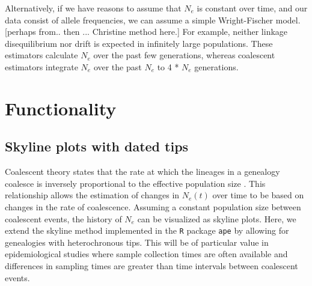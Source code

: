 \documentclass[english,titlepage]{article}
\begin{document}
Alternatively, if we have reasons to assume that $N_{e}$ is constant over time, and our data consist of allele frequencies, we can assume a simple Wright-Fischer model. [perhaps from.. then ... Christine method here.] For example, neither linkage disequilibrium nor drift is expected in infinitely large populations. These estimators calculate $N_e$ over the past few generations, whereas coalescent estimators integrate $N_e$ over the past $N_e$ to 4 * $N_e$ generations.



\section*{Functionality}
\subsection*{Skyline plots with dated tips}

Coalescent theory states that the rate at which the lineages in a genealogy coalesce is inversely proportional to the effective population size \citep{Kingman1982} \citep{slatkin_pairwise_1991}. This relationship allows the estimation of changes in $N_e(t)$ over time to be based on changes in the rate of coalescence. Assuming a constant population size between coalescent events, the history of $N_e$ can be visualized as skyline plots. Here, we extend the skyline method implemented in the \texttt{R} package \texttt{ape} \citep{Paradis2004} by allowing for genealogies with heterochronous tips. This will be of particular value in epidemiological studies where sample collection times are often available and differences in sampling times are greater than time intervals between coalescent events. 
\end{document}
